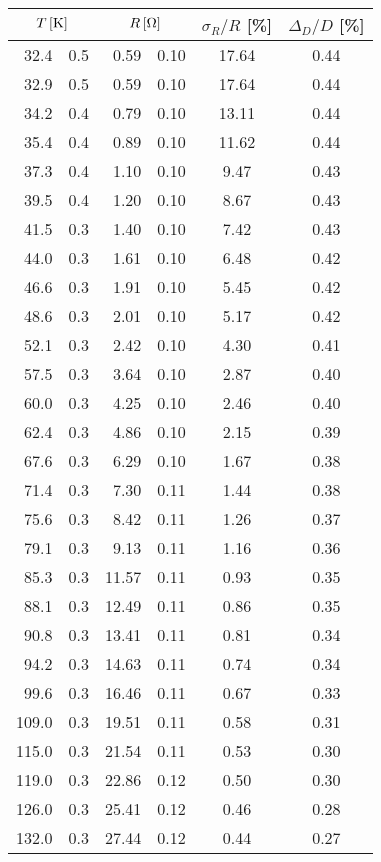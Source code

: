 \begin{tabular}{r@{ $\pm$ }lr@{ $\pm$ }l|cc}
\multicolumn{2}{c}{$\unit[T]{[K]}$} &\multicolumn{2}{c}{$\unit[R]{[\ohm]}$} & $\sigma_R/ R$ [\%] &  $\Delta_D / D$ [\%] \\
 \hline
32.4 & 0.5 & 0.59 & 0.10 & 17.64 & 0.44 \\ 
 32.9 & 0.5 & 0.59 & 0.10 & 17.64 & 0.44 \\ 
 34.2 & 0.4 & 0.79 & 0.10 & 13.11 & 0.44 \\ 
 35.4 & 0.4 & 0.89 & 0.10 & 11.62 & 0.44 \\ 
 37.3 & 0.4 & 1.10 & 0.10 & 9.47 & 0.43 \\ 
 39.5 & 0.4 & 1.20 & 0.10 & 8.67 & 0.43 \\ 
 41.5 & 0.3 & 1.40 & 0.10 & 7.42 & 0.43 \\ 
 44.0 & 0.3 & 1.61 & 0.10 & 6.48 & 0.42 \\ 
 46.6 & 0.3 & 1.91 & 0.10 & 5.45 & 0.42 \\ 
 48.6 & 0.3 & 2.01 & 0.10 & 5.17 & 0.42 \\ 
 52.1 & 0.3 & 2.42 & 0.10 & 4.30 & 0.41 \\ 
 57.5 & 0.3 & 3.64 & 0.10 & 2.87 & 0.40 \\ 
 60.0 & 0.3 & 4.25 & 0.10 & 2.46 & 0.40 \\ 
 62.4 & 0.3 & 4.86 & 0.10 & 2.15 & 0.39 \\ 
 67.6 & 0.3 & 6.29 & 0.10 & 1.67 & 0.38 \\ 
 71.4 & 0.3 & 7.30 & 0.11 & 1.44 & 0.38 \\ 
 75.6 & 0.3 & 8.42 & 0.11 & 1.26 & 0.37 \\ 
 79.1 & 0.3 & 9.13 & 0.11 & 1.16 & 0.36 \\ 
 85.3 & 0.3 & 11.57 & 0.11 & 0.93 & 0.35 \\ 
 88.1 & 0.3 & 12.49 & 0.11 & 0.86 & 0.35 \\ 
 90.8 & 0.3 & 13.41 & 0.11 & 0.81 & 0.34 \\ 
 94.2 & 0.3 & 14.63 & 0.11 & 0.74 & 0.34 \\ 
 99.6 & 0.3 & 16.46 & 0.11 & 0.67 & 0.33 \\ 
 109.0 & 0.3 & 19.51 & 0.11 & 0.58 & 0.31 \\ 
 115.0 & 0.3 & 21.54 & 0.11 & 0.53 & 0.30 \\ 
 119.0 & 0.3 & 22.86 & 0.12 & 0.50 & 0.30 \\ 
 126.0 & 0.3 & 25.41 & 0.12 & 0.46 & 0.28 \\ 
 132.0 & 0.3 & 27.44 & 0.12 & 0.44 & 0.27 \\ 

\end{tabular}
